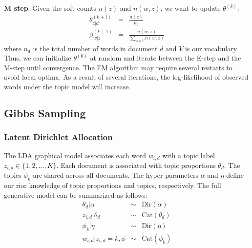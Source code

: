 \textbf{M step}. Given the soft counts $n(z)$ and $n(w,z)$, we want to update $\theta^{(k)}$:
\begin{eqnarray}
    \theta_{z|d}^{(k+1)} &=& \frac{n(z)}{n_d} \\
    \beta_{w|z}^{(k+1)} &=& \frac{n(w,z)}{\sum_{w \in V} n(w,z)}
\end{eqnarray}
where $n_d$ is the total number of words in document $d$ and $V$ is our vocabulary. Thus, we can initialize $\theta^{(0)}$ at random and iterate between the E-step and the M-step until convergence. The EM algorithm may require several restarts to avoid local optima. As a result of several iterations, the log-likelihood of observed words under the topic model will increase.    

\subsection{Gibbs Sampling}


\subsubsection{Latent Dirichlet Allocation}

The LDA graphical model associates each word $w_{i,d}$ with a topic label $z_{i,d} \in \{1,2,...,K\}$. Each document is associated with topic proportions $\theta_d$. The topics $\phi_k$ are shared across all documents. The hyper-parameters $\alpha$ and $\eta$ define our rior knowledge of topic proportions and topics, respectively. The full generative model can be summarized as follows:
\begin{eqnarray}
    \theta_d | \alpha &\sim& \mathrm{Dir}(\alpha)\\
    z_{i,d} | \theta_d &\sim& \mathrm{Cat}(\theta_d)\\
    \phi_k | \eta &\sim& \mathrm{Dir}(\eta)\\
    w_{i,d}|z_{i,d}=k,\phi &\sim& \mathrm{Cat}(\phi_k)
\end{eqnarray}


